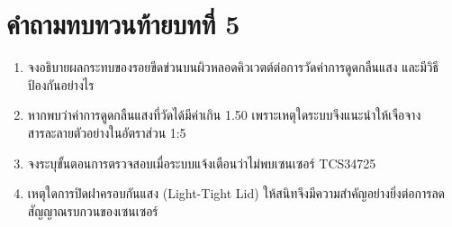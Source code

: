 \section*{คำถามทบทวนท้ายบทที่ 5}
\begin{enumerate}[leftmargin=1.5em, itemsep=3pt]
    \item จงอธิบายผลกระทบของรอยขีดข่วนบนผิวหลอดคิวเวตต์ต่อการวัดค่าการดูดกลืนแสง และมีวิธีป้องกันอย่างไร
    \item หากพบว่าค่าการดูดกลืนแสงที่วัดได้มีค่าเกิน 1.50 เพราะเหตุใดระบบจึงแนะนำให้เจือจางสารละลายตัวอย่างในอัตราส่วน 1:5
    \item จงระบุขั้นตอนการตรวจสอบเมื่อระบบแจ้งเตือนว่าไม่พบเซนเซอร์ TCS34725
    \item เหตุใดการปิดฝาครอบกันแสง (Light-Tight Lid) ให้สนิทจึงมีความสำคัญอย่างยิ่งต่อการลดสัญญาณรบกวนของเซนเซอร์
\end{enumerate}
